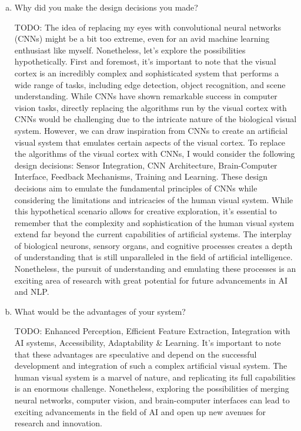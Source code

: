 \documentclass[letterpaper,11pt]{article}
\begin{document}
\begin{enumerate}[a)]
\item Why did you make the design decisions you made?

\begin{tcolorbox}
TODO: The idea of replacing my eyes with convolutional neural networks (CNNs) might be a bit too extreme, even for an avid machine learning enthusiast like myself. Nonetheless, let's explore the possibilities hypothetically. First and foremost, it's important to note that the visual cortex is an incredibly complex and sophisticated system that performs a wide range of tasks, including edge detection, object recognition, and scene understanding. While CNNs have shown remarkable success in computer vision tasks, directly replacing the algorithms run by the visual cortex with CNNs would be challenging due to the intricate nature of the biological visual system. However, we can draw inspiration from CNNs to create an artificial visual system that emulates certain aspects of the visual cortex. To replace the algorithms of the visual cortex with CNNs, I would consider the following design decisions: Sensor Integration, CNN Architecture, Brain-Computer Interface, Feedback Mechanisms, Training and Learning. These design decisions aim to emulate the fundamental principles of CNNs while considering the limitations and intricacies of the human visual system. While this hypothetical scenario allows for creative exploration, it's essential to remember that the complexity and sophistication of the human visual system extend far beyond the current capabilities of artificial systems. The interplay of biological neurons, sensory organs, and cognitive processes creates a depth of understanding that is still unparalleled in the field of artificial intelligence. Nonetheless, the pursuit of understanding and emulating these processes is an exciting area of research with great potential for future advancements in AI and NLP.
\end{tcolorbox}

\item What would be the advantages of your system? 

\begin{tcolorbox}
TODO: Enhanced Perception, Efficient Feature Extraction, Integration with AI systems, Accessibility, Adaptability & Learning. It's important to note that these advantages are speculative and depend on the successful development and integration of such a complex artificial visual system. The human visual system is a marvel of nature, and replicating its full capabilities is an enormous challenge. Nonetheless, exploring the possibilities of merging neural networks, computer vision, and brain-computer interfaces can lead to exciting advancements in the field of AI and open up new avenues for research and innovation. 
\end{tcolorbox}


\end{enumerate}
\end{document}
